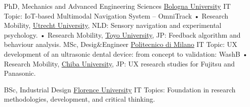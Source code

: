 {PhD, Mechanics and Advanced Engineering Sciences}
{\href{https://www.unibo.it/}{\color{blue}Bologna University}}
{IT}
{Topic: IoT-based Multimodal Navigation System – OmniTrack\newline
• Research Mobility, \href{https://www.uu.nl/en}{\color{blue}Utrecht University}, NLD: Sensory navigation and experimental psychology.\newline
• Research Mobility, \href{https://www.iniad.org/en/}{\color{blue}Toyo University}, JP: Feedback algorithm and behaviour analysis.
}
{MSc, Desig\&Engineer}
{\href{https://www.polimi.it/en}{\color{blue}Politecnico di Milano}}
{IT}
{{Topic: UX development of an ultrasonic dental device: from concept to validation: WashB}\newline
• Research Mobility, \href{https://www.chiba-u.ac.jp/e/}{\color{blue}Chiba University}, JP: UX research studies for Fujitsu and Panasonic.
} 

{BSc, Industrial Design}
{\href{https://www.unifi.it/changelang-eng.html}{\color{blue}Florence University}}
{IT}
{Topics: Foundation in research methodologies, development, and critical thinking.}




